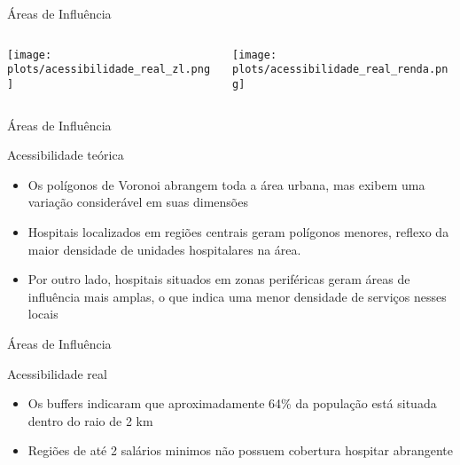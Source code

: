 \documentclass{beamer}
\begin{document}
\begin{frame}{Áreas de Influência}
    \begin{columns}
        \begin{column}{0.5\textwidth}
            \texttt{[image: plots/acessibilidade\_real\_zl.png]} 
        \end{column}

        \begin{column}{0.5\textwidth}
            \texttt{[image: plots/acessibilidade\_real\_renda.png]} 
        \end{column}
    \end{columns}
\end{frame}

\begin{frame}{Áreas de Influência}
    \begin{block}{Acessibilidade teórica}
      \begin{itemize}
        \item Os polígonos de Voronoi abrangem toda a área urbana, mas exibem uma variação considerável em suas dimensões
        \item Hospitais localizados em regiões centrais geram polígonos menores, reflexo da maior densidade de unidades hospitalares na área.
        \item Por outro lado, hospitais situados em zonas periféricas geram áreas de influência mais amplas, o que indica uma menor densidade de serviços nesses locais
      \end{itemize}
    \end{block}
\end{frame}

\begin{frame}{Áreas de Influência}
    \begin{block}{Acessibilidade real}
      \begin{itemize}
        \item Os buffers indicaram que aproximadamente 64\% da população está situada dentro do raio de 2 km
        \item Regiões de até 2 salários minimos não possuem cobertura hospitar abrangente
      \end{itemize}   
    \end{block}
\end{frame}
\end{document}

